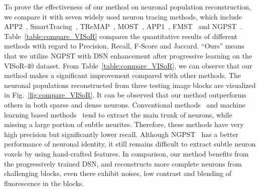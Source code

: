 To prove the effectiveness of our method on neuronal population reconstruction, we compare it with seven widely used neuron tracing methods, which include APP2~\cite{Xiao2013}, SmartTracing~\cite{Chen2015}, TReMAP~\cite{Zhou2016}, MOST~\cite{Wu2014}, APP1~\cite{Peng2011}, FMST~\cite{Yang2018} and NGPST~\cite{Quan2015}.
%
Table~\ref{table:compare_VISoR} compares the quantitative results of different methods with regard to Precision, Recall, F-Score and Jaccard.
``Ours'' means that we utilize NGPST with DSN enhancement after progressive learning on the VISoR-40 dataset.
From Table~\ref{table:compare_VISoR}, we can observe that our method makes a significant improvement compared with other methods.
The neuronal populations reconstructed from three testing image blocks are visualized in Fig.~\ref{fig:compare_VISoR}.
It can be observed that our method outperforms others in both sparse and dense neurons.
Conventional methods~\cite{Xiao2013, Peng2011, Wu2014, Zhou2016} and machine learning based methods~\cite{Chen2015, Yang2018} tend to extract the main trunk of neurons, while missing a large portion of subtle neurites. 
Therefore, these methods have very high precision but significantly lower recall.
Although NGPST~\cite{Quan2015} has a better performance of neuronal identity, it still remains difficult to extract subtle neuron voxels by using hand-crafted features.
%
In comparison, our method benefits from the progressively trained DSN, and reconstructs more complete neurons from challenging blocks, even there exhibit noises, low contrast and blending of fluorescence in the blocks.
